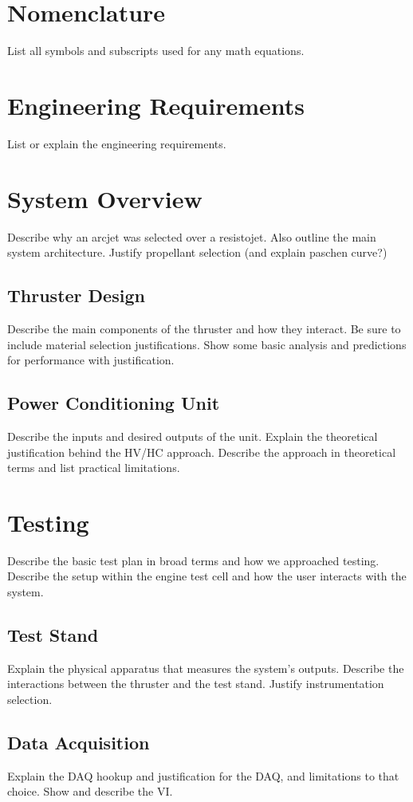 \documentclass[journal]{IEEEtran}
\begin{document}
\section{Nomenclature}
List all symbols and subscripts used for any math equations.

\section{Engineering Requirements}
List or explain the engineering requirements.

\section{System Overview}
Describe why an arcjet was selected over a resistojet.
Also outline the main system architecture.
Justify propellant selection (and explain paschen curve?)

\subsection{Thruster Design}
Describe the main components of the thruster and how they interact. Be sure to include material selection justifications. Show some basic analysis and predictions for performance with justification.

\subsection{Power Conditioning Unit}
Describe the inputs and desired outputs of the unit. Explain the theoretical justification behind the HV/HC approach. Describe the approach in theoretical terms and list practical limitations.

\section{Testing}
Describe the basic test plan in broad terms and how we approached testing. Describe the setup within the engine test cell and how the user interacts with the system.

\subsection{Test Stand}
Explain the physical apparatus that measures the system's outputs. Describe the interactions between the thruster and the test stand. Justify instrumentation selection.

\subsection{Data Acquisition}
Explain the DAQ hookup and justification for the DAQ, and limitations to that choice. Show and describe the VI.
\end{document}
